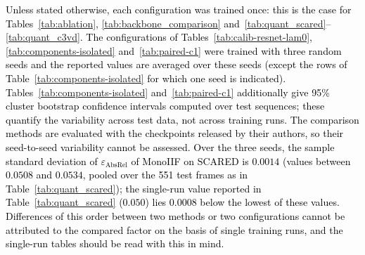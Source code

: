 \documentclass[a4paper,fleqn]{cas-dc}
\begin{document}
{\textcolor{black}
{
Unless stated otherwise, each configuration was trained once: this is the case for
Tables~\ref{tab:ablation}, \ref{tab:backbone_comparison} and~\ref{tab:quant_scared}--\ref{tab:quant_c3vd}.
The configurations of Tables~\ref{tab:calib-resnet-lam0}, \ref{tab:components-isolated}
and~\ref{tab:paired-c1} were trained with three random seeds and the reported values are averaged over these seeds \textcolor{black}{(except the rows of Table~\ref{tab:components-isolated} for which one seed is indicated)}. Tables~\ref{tab:components-isolated} and~\ref{tab:paired-c1} additionally
give 95\% cluster bootstrap confidence intervals computed over test sequences; these quantify the
variability across test data, not across training runs. The comparison methods are evaluated with
the checkpoints released by their authors, so their seed-to-seed variability cannot be assessed.
Over the three seeds, the sample standard deviation of $\varepsilon_\textrm{AbsRel}$ of MonoIIF on
SCARED is \textcolor{black}{$0.0014$ (values between $0.0508$ and $0.0534$}, pooled over the 551 test frames as in
Table~\ref{tab:quant_scared}); the single-run value reported in Table~\ref{tab:quant_scared}
\textcolor{black}{($0.050$) lies 0.0008 below the lowest of these values.} Differences of this order between two methods or two
configurations cannot be attributed to the compared factor on the basis of single training runs,
and the single-run tables should be read with this in mind.}
}
\end{document}
